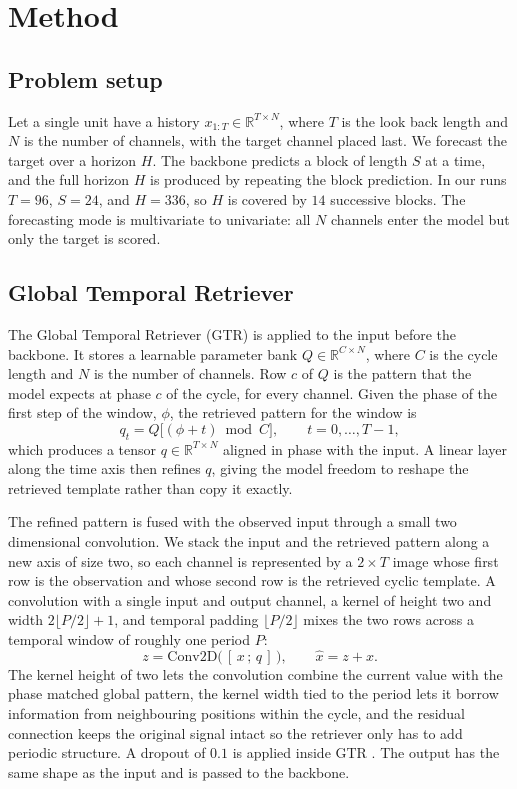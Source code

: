 \documentclass[11pt]{article}
\begin{document}
\section{Method}
\subsection{Problem setup}
Let a single unit have a history $x_{1:T}\in\mathbb{R}^{T\times N}$, where $T$ is the look back
length and $N$ is the number of channels, with the target channel placed last. We forecast the
target over a horizon $H$. The backbone predicts a block of length $S$ at a time, and the full
horizon $H$ is produced by repeating the block prediction. In our runs $T=96$, $S=24$, and
$H=336$, so $H$ is covered by $14$ successive blocks. The forecasting mode is multivariate to
univariate: all $N$ channels enter the model but only the target is scored.

\subsection{Global Temporal Retriever \cite{cao2026gtr}}
The Global Temporal Retriever (GTR) \cite{cao2026gtr} is applied to the input before the backbone. It stores a
learnable parameter bank $Q\in\mathbb{R}^{C\times N}$, where $C$ is the cycle length and $N$ is
the number of channels. Row $c$ of $Q$ is the pattern that the model expects at phase $c$ of the
cycle, for every channel. Given the phase of the first step of the window, $\phi$, the retrieved
pattern for the window is
\begin{equation}
q_{t} = Q\big[(\phi + t)\bmod C\big], \qquad t=0,\dots,T-1,
\end{equation}
which produces a tensor $q\in\mathbb{R}^{T\times N}$ aligned in phase with the input. A linear
layer along the time axis then refines $q$, giving the model freedom to reshape the retrieved
template rather than copy it exactly.

The refined pattern is fused with the observed input through a small two dimensional
convolution. We stack the input and the retrieved pattern along a new axis of size two, so each
channel is represented by a $2\times T$ image whose first row is the observation and whose
second row is the retrieved cyclic template. A convolution with a single input and output
channel, a kernel of height two and width $2\lfloor P/2\rfloor+1$, and temporal padding
$\lfloor P/2\rfloor$ mixes the two rows across a temporal window of roughly one period $P$:
\begin{equation}
z = \mathrm{Conv2D}\big(\,[\,x \,;\, q\,]\,\big), \qquad
\hat{x} = z + x .
\end{equation}
The kernel height of two lets the convolution combine the current value with the phase matched
global pattern, the kernel width tied to the period lets it borrow information from neighbouring
positions within the cycle, and the residual connection keeps the original signal intact so the
retriever only has to add periodic structure. A dropout of $0.1$ is applied inside GTR \cite{cao2026gtr}. The
output has the same shape as the input and is passed to the backbone.
\end{document}
